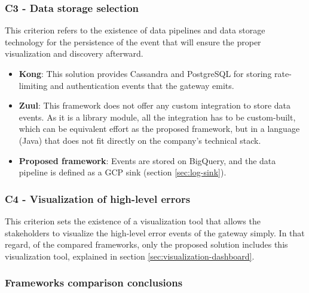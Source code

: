 \documentclass[english, 12pt, a4paper, sci, utf8, a-1b, online]{aaltothesis}
\begin{document}
\subsubsection*{C3 - Data storage selection}

This criterion refers to the existence of data pipelines and data storage technology for the persistence of the event that will ensure the proper visualization and discovery afterward.

\begin{itemize}
    \item \textbf{Kong}: This solution provides Cassandra and PostgreSQL for storing rate-limiting and authentication events that the gateway emits.
    \item \textbf{Zuul}: This framework does not offer any custom integration to store data events. As it is a library module, all the integration has to be custom-built, which can be equivalent effort as the proposed framework, but in a language (Java) that does not fit directly on the company's technical stack.
    \item \textbf{Proposed framework}: Events are stored on BigQuery, and the data pipeline is defined as a GCP sink (section \ref{sec:log-sink}).
\end{itemize}

\subsubsection*{C4 - Visualization of high-level errors}

This criterion sets the existence of a visualization tool that allows the stakeholders to visualize the high-level error events of the gateway simply. In that regard, of the compared frameworks, only the proposed solution includes this visualization tool, explained in section \ref{sec:visualization-dashboard}.

\subsubsection{Frameworks comparison conclusions}
\end{document}
